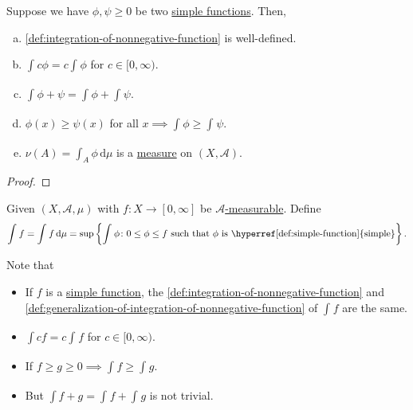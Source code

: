 \begin{proposition}
	Suppose we have \(\phi, \psi \geq 0\) be two \hyperref[def:simple-function]{simple functions}. Then,
	\begin{enumerate}[(a)]
		\item \autoref{def:integration-of-nonnegative-function} is well-defined.
		\item \(\int_{}^{} c\phi = c \int_{}^{} \phi \) for \(c\in [0, \infty )\).
		\item \(\int_{}^{} \phi + \psi  =  \int_{}^{} \phi + \int_{}^{} \psi\).
		\item \(\phi (x) \geq \psi (x)\) for all \(x \implies \int_{}^{} \phi \geq \int_{}^{} \psi \).
		\item\label{prop:nu-measure} \(\nu (A) = \int_{A}^{} \phi  \,\mathrm{d}\mu  \) is a \hyperref[def:measure]{measure} on \((X, \mathcal{A} )\).
	\end{enumerate}
\end{proposition}
\begin{proof}
\end{proof}

\begin{definition}\label{def:generalization-of-integration-of-nonnegative-function}
	Given \((X, \mathcal{A} , \mu )\) with \(f\colon X\to [0, \infty ]\) be \hyperref[def:A-measurable-function]{\(\mathcal{A}\)-measurable}.
	Define
	\[
		\int_{}^{} f= \int_{}^{} f \,\mathrm{d}\mu = \sup \left\{\int_{}^{} \phi \colon 0\leq \phi \leq f \text{ such that \(\phi\) is \hyperref[def:simple-function]{simple}}  \right\}.
	\]
\end{definition}
\begin{note}
	Note that
	\begin{itemize}
		\item If \(f\) is a \hyperref[def:simple-function]{simple function}, the \autoref{def:integration-of-nonnegative-function} and \autoref{def:generalization-of-integration-of-nonnegative-function}
		      of \(\int_{}^{} f \) are the same.
		\item \(\int cf = c\int_{}^{} f\) for \(c\in [0, \infty )\).
		\item If \(f\geq g \geq 0 \implies \int_{}^{} f\geq \int_{}^{} g\).
		\item But \(\int f+g = \int_{}^{} f + \int_{}^{} g\) is not trivial.
	\end{itemize}
\end{note}

